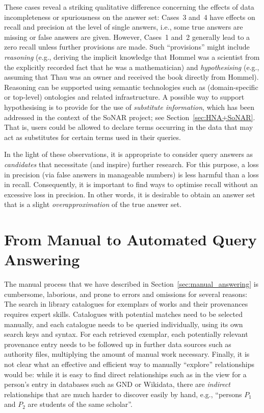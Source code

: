 %
These cases reveal a striking qualitative difference concerning the effects of data incompleteness or spuriousness
on the answer set: Cases~3 and~4 have effects on recall and precision at the level of single answers,
i.e., some true answers are missing or false answers are given.
However, Cases~1 and~2 generally lead to a zero recall unless further provisions are made.
Such \enquote{provisions} might include \emph{reasoning}
(e.g., deriving the implicit knowledge that Hommel was a scientist from the explicitly recorded fact that he was a mathematician)
and \emph{hypothesising} (e.g., assuming that Thau was an owner and received the book directly from Hommel).
Reasoning can be supported using semantic technologies such as (domain-specific or top-level) ontologies and related infrastructure.
A possible way to support hypothesising is to provide for the use of \emph{substitute information},
which has been addressed in the context of the \gls{SoNAR} project; see Section~\ref{sec:HNA+SoNAR}.
That is, users could be allowed to declare terms occurring in the data that may act as substitutes for certain terms used in their queries.

In the light of these observations,
it is appropriate to consider
query answers as \emph{candidates} that necessitate (and inspire) further research.
For this purpose, a loss in precision (via false answers in manageable numbers) 
is less harmful than a loss in recall.
Consequently, it is important to find ways to optimise recall without an excessive loss in precision.
In other words, it is desirable to obtain an answer set that is a slight \emph{overapproximation}
of the true answer set.

\section{From Manual to Automated Query Answering}
\label{sec:manual_vs_automated}

The manual process that we have described in Section~\ref{sec:manual_answering}
is cumbersome, laborious, and prone to errors and omissions for several reasons:
The search in library catalogues for exemplars of works and their provenances requires expert skills.
Catalogues with potential matches need to be selected manually,
and each catalogue needs to be queried individually, using its own search keys and syntax. 
For each retrieved exemplar, each potentially relevant provenance entry 
needs to be followed up in further data sources such as authority files,
multiplying the amount of manual work necessary.
Finally, it is not clear what an effective and efficient way to manually \enquote{explore}
relationships would be:
while it is easy to find direct relationships such as  in the view for a person's entry
in databases such as \gls{GND} or Wikidata, there are \emph{indirect} relationships
that are much harder to discover easily by hand,
e.g., \enquote{persons $P_1$ and $P_2$ are students of the same scholar}.

